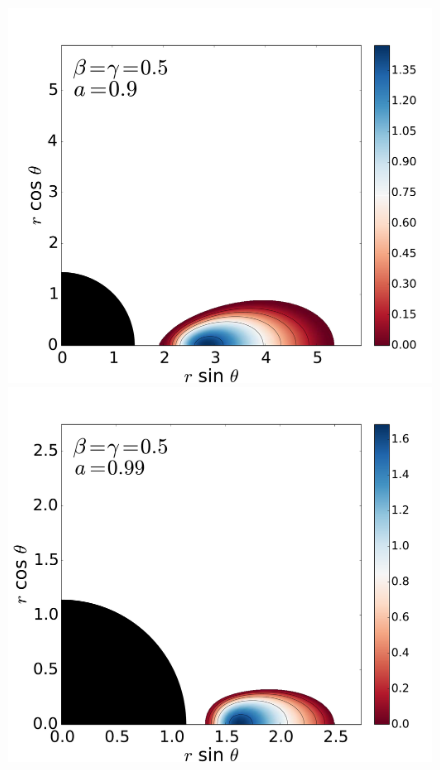 \documentclass{aa}
\begin{document}
\begin{figure}
\includegraphics[scale=0.14]{figures/fig2_2_2.pdf}
\hspace{-0.2cm}
\includegraphics[scale=0.14]{figures/fig2_2_3.pdf}
\\

\end{figure}
\end{document}
